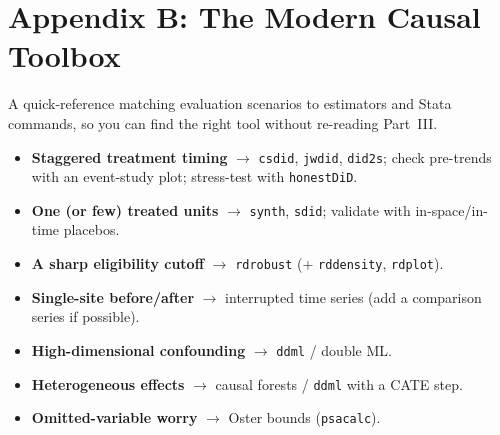 \documentclass[
    a4paper,
    fontsize=10pt,
    twoside=true,
    numbers=noenddot,
]{kaobook}
\begin{document}
\chapter*{Appendix B: The Modern Causal Toolbox}
A quick-reference matching evaluation scenarios to estimators and Stata commands, so you can find the right tool without re-reading Part~III.
\begin{itemize}
    \item \textbf{Staggered treatment timing} $\rightarrow$ \texttt{csdid}, \texttt{jwdid}, \texttt{did2s}; check pre-trends with an event-study plot; stress-test with \texttt{honestDiD}.
    \item \textbf{One (or few) treated units} $\rightarrow$ \texttt{synth}, \texttt{sdid}; validate with in-space/in-time placebos.
    \item \textbf{A sharp eligibility cutoff} $\rightarrow$ \texttt{rdrobust} (+ \texttt{rddensity}, \texttt{rdplot}).
    \item \textbf{Single-site before/after} $\rightarrow$ interrupted time series (add a comparison series if possible).
    \item \textbf{High-dimensional confounding} $\rightarrow$ \texttt{ddml} / double ML.
    \item \textbf{Heterogeneous effects} $\rightarrow$ causal forests / \texttt{ddml} with a CATE step.
    \item \textbf{Omitted-variable worry} $\rightarrow$ Oster bounds (\texttt{psacalc}).
\end{itemize}
\end{document}
